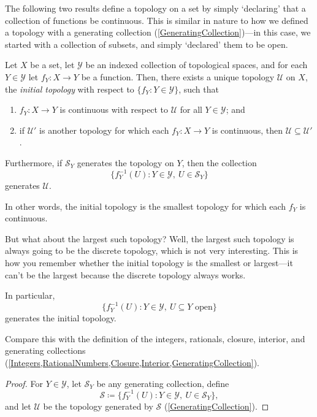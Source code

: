 The following two results define a topology on a set by simply `declaring' that a collection of functions be continuous.  This is similar in nature to how we defined a topology with a generating collection (\cref{GeneratingCollection})---in this case, we started with a collection of subsets, and simply `declared' them to be open.
\begin{prp}\label{InitialTopology}
\begin{savenotes}
Let $X$ be a set, let $\mathcal{Y}$ be an indexed collection of topological spaces, and for each $Y\in \mathcal{Y}$ let $f_Y:X\rightarrow Y$ be a function.  Then, there exists a unique topology  $\mathcal{U}$ on $X$, the \emph{initial topology} with respect to $\{ f_Y:Y\in \mathcal{Y}\}$, such that
\begin{enumerate}
\item $f_Y:X\rightarrow Y$ is continuous with respect to $\mathcal{U}$ for all $Y\in \mathcal{Y}$; and
\item if $\mathcal{U}'$ is another topology for which each $f_Y:X\rightarrow Y$ is continuous, then $\mathcal{U}\subseteq \mathcal{U}'$.
\end{enumerate}
Furthermore, if $\mathcal{S}_Y$ generates the topology on $Y$, then the collection
\begin{equation}
\{ f_Y^{-1}(U):Y\in \mathcal{Y},\ U\in \mathcal{S}_Y\}
\end{equation}
generates $\mathcal{U}$.
\begin{rmk}
In other words, the initial topology is the smallest topology for which each $f_Y$ is continuous.
\end{rmk}
\begin{rmk}
But what about the largest such topology?  Well, the largest such topology is always going to be the discrete topology, which is not very interesting.  This is how you remember whether the initial topology is the smallest or largest---it can't be the largest because the discrete topology always works.
\end{rmk}
\begin{rmk}
In particular,
\begin{equation}
\{ f_Y^{-1}(U):Y\in \mathcal{Y},\ U\subseteq Y\text{ open}\}
\end{equation}
generates the initial topology.
\end{rmk}
\begin{rmk}
Compare this with the definition of the integers, rationals, closure, interior, and generating collections (\cref{Integers,RationalNumbers,Closure,Interior,GeneratingCollection}).
\end{rmk}
\begin{proof}
For $Y\in \mathcal{Y}$, let $\mathcal{S}_Y$ be any generating collection, define
\begin{equation}
\mathcal{S}\coloneqq \{ f_Y^{-1}(U):Y\in \mathcal{Y},\ U\in \mathcal{S}_Y\} ,
\end{equation}
and let $\mathcal{U}$ be the topology generated by $\mathcal{S}$ (\cref{GeneratingCollection}).


\end{proof}
\end{savenotes}
\end{prp}

